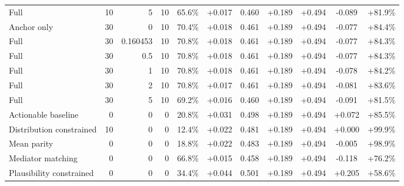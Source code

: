 \begin{table}[htbp]
\begin{tabular}{lrrrccccccc}
Full & 10 & 5 & 10 & 65.6\% & +0.017 & 0.460 & +0.189 & +0.494 & -0.089 & +81.9\% \\
Anchor only & 30 & 0 & 10 & 70.4\% & +0.018 & 0.461 & +0.189 & +0.494 & -0.077 & +84.4\% \\
Full & 30 & 0.160453 & 10 & 70.8\% & +0.018 & 0.461 & +0.189 & +0.494 & -0.077 & +84.3\% \\
Full & 30 & 0.5 & 10 & 70.8\% & +0.018 & 0.461 & +0.189 & +0.494 & -0.077 & +84.3\% \\
Full & 30 & 1 & 10 & 70.8\% & +0.018 & 0.461 & +0.189 & +0.494 & -0.078 & +84.2\% \\
Full & 30 & 2 & 10 & 70.8\% & +0.017 & 0.461 & +0.189 & +0.494 & -0.081 & +83.6\% \\
Full & 30 & 5 & 10 & 69.2\% & +0.016 & 0.460 & +0.189 & +0.494 & -0.091 & +81.5\% \\
Actionable baseline & 0 & 0 & 0 & 20.8\% & +0.031 & 0.498 & +0.189 & +0.494 & +0.072 & +85.5\% \\
Distribution constrained & 10 & 0 & 0 & 12.4\% & +0.022 & 0.481 & +0.189 & +0.494 & +0.000 & +99.9\% \\
Mean parity & 0 & 0 & 0 & 18.8\% & +0.022 & 0.483 & +0.189 & +0.494 & -0.005 & +98.9\% \\
Mediator matching & 0 & 0 & 0 & 66.8\% & +0.015 & 0.458 & +0.189 & +0.494 & -0.118 & +76.2\% \\
Plausibility constrained & 0 & 0 & 0 & 34.4\% & +0.044 & 0.501 & +0.189 & +0.494 & +0.205 & +58.6\% \\
\bottomrule
\end{tabular}
\end{table}
